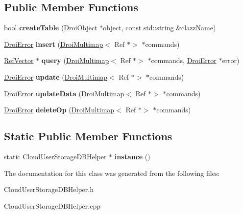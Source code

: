 \subsection*{Public Member Functions}
\begin{DoxyCompactItemize}
\item 
\mbox{\label{class_cloud_user_storage_d_b_helper_a482cb19944599cbf15d99931be486609}} 
bool {\bfseries create\+Table} (\hyperlink{class_droi_object}{Droi\+Object} $\ast$object, const std\+::string \&clazz\+Name)
\item 
\mbox{\label{class_cloud_user_storage_d_b_helper_a6211785d8e302404f2b3750ac0c0fec0}} 
\hyperlink{class_droi_error}{Droi\+Error} {\bfseries insert} (\hyperlink{class_droi_multimap}{Droi\+Multimap}$<$ Ref $\ast$$>$ $\ast$commands)
\item 
\mbox{\label{class_cloud_user_storage_d_b_helper_a740c082715a0f1e1055db32869d4fec0}} 
\hyperlink{class_ref_vector}{Ref\+Vector} $\ast$ {\bfseries query} (\hyperlink{class_droi_multimap}{Droi\+Multimap}$<$ Ref $\ast$$>$ $\ast$commands, \hyperlink{class_droi_error}{Droi\+Error} $\ast$error)
\item 
\mbox{\label{class_cloud_user_storage_d_b_helper_add1c1afa7e163443b6161e4b3b928818}} 
\hyperlink{class_droi_error}{Droi\+Error} {\bfseries update} (\hyperlink{class_droi_multimap}{Droi\+Multimap}$<$ Ref $\ast$$>$ $\ast$commands)
\item 
\mbox{\label{class_cloud_user_storage_d_b_helper_a4acbc93c88361099a8103e8275224f88}} 
\hyperlink{class_droi_error}{Droi\+Error} {\bfseries update\+Data} (\hyperlink{class_droi_multimap}{Droi\+Multimap}$<$ Ref $\ast$$>$ $\ast$commands)
\item 
\mbox{\label{class_cloud_user_storage_d_b_helper_abde013b7eb4b994e518cbe21fa443746}} 
\hyperlink{class_droi_error}{Droi\+Error} {\bfseries delete\+Op} (\hyperlink{class_droi_multimap}{Droi\+Multimap}$<$ Ref $\ast$$>$ $\ast$commands)
\end{DoxyCompactItemize}
\subsection*{Static Public Member Functions}
\begin{DoxyCompactItemize}
\item 
\mbox{\label{class_cloud_user_storage_d_b_helper_a194f31edf7f0fdb3c642d1a3f0858c3a}} 
static \hyperlink{class_cloud_user_storage_d_b_helper}{Cloud\+User\+Storage\+D\+B\+Helper} $\ast$ {\bfseries instance} ()
\end{DoxyCompactItemize}


The documentation for this class was generated from the following files\+:\begin{DoxyCompactItemize}
\item 
Cloud\+User\+Storage\+D\+B\+Helper.\+h\item 
Cloud\+User\+Storage\+D\+B\+Helper.\+cpp\end{DoxyCompactItemize}
